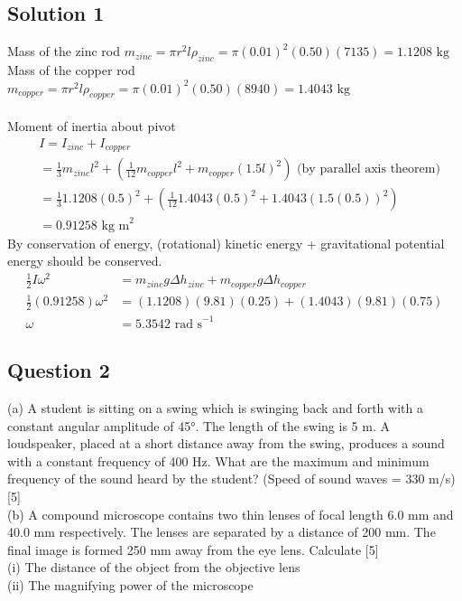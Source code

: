 \documentclass{article}
\begin{document}
\subsection{Solution 1}
Mass of the zinc rod $m_{zinc} = \pi r^2 l \rho_{zinc} = \pi (0.01)^2 (0.50) (7135) = 1.1208 \text{ kg}$ \\
Mass of the copper rod $m_{copper} = \pi r^2 l \rho_{copper} = \pi (0.01)^2 (0.50) (8940) = 1.4043 \text{ kg}$ \\
\\ Moment of inertia about pivot 
\begin{align}
	&I=I_{zinc} + I_{copper}\\
	&=\frac{1}{3} m_{zinc} l^2 + \left(\frac{1}{12} m_{copper} l^2 + m_{copper} (1.5l)^2\right) \text{ (by parallel axis theorem)} \\
	&= \frac{1}{3} 1.1208 (0.5)^2 + \left(\frac{1}{12} 1.4043 (0.5)^2 + 1.4043 (1.5(0.5))^2\right) \\
	&= 0.91258 \text{ kg m}^2
\end{align}
By conservation of energy, (rotational) kinetic energy + gravitational potential energy should be conserved.
\begin{align}
	\frac{1}{2} I \omega^2 &= m_{zinc}g \Delta h_{zinc} + m_{copper}g \Delta h_{copper} \\
	\frac{1}{2}(0.91258) \omega^2 &= (1.1208)(9.81)(0.25) + (1.4043)(9.81)(0.75) \\
	\omega &= 5.3542 \text{ rad s}^{-1}
\end{align}

\subsection{Question 2}
(a) A student is sitting on a swing which is swinging back and forth with a constant angular amplitude of 45°. The length of the swing is 5 m. A loudspeaker, placed at a short distance away from the swing, produces a sound with a constant frequency of 400 Hz. What are the maximum and minimum frequency of the sound heard by the student? (Speed of sound waves = 330 m/s) [5] \\
(b) A compound microscope contains two thin lenses of focal length 6.0 mm and 40.0 mm respectively. The lenses are separated by a distance of 200 mm. The final image is formed 250 mm away from the eye lens. Calculate [5] \\
(i) The distance of the object from the objective lens \\
(ii) The magnifying power of the microscope\\
\end{document}
